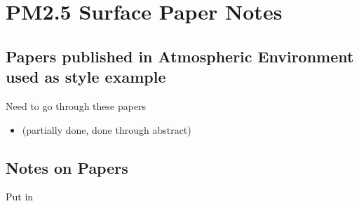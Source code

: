 \section{PM2.5 Surface Paper Notes}

\subsection{Papers published in Atmospheric Environment used as style example}

Need to go through these papers
\begin{itemize}
\item \cite{BrokampExposure2017} (partially done, done through abstract)
\end{itemize}



\subsection{Notes on Papers}

Put in \cite{BrokampExposure2017}
